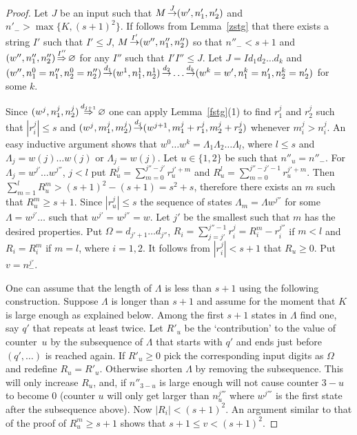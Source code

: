 \documentclass[12pt]{article}
\begin{document}
\begin{proof}
Let $J$ be an input such that $M\mathop{\to}\limits^{J}(w',n'_1,n'_2)$ and
$n'_->\max\{K,(s+1)^2\}$. If follows from Lemma~\ref{zstg} that there
exists a string $I'$ such that $I'\leq J$, $M\mathop{\to}\limits^{I'}(w'',n''_1,
n''_2)$ so that $n''_-<s+1$ and $(w'',n''_1,n''_2)\mathop{\Rightarrow}\limits^{I''}\varnothing$ 
for any $I''$ such that $I'I''\leq J$. Let $J=Id_1d_2\ldots d_k$ and 
$(w'',n^0_1=n''_1,n^0_2=n''_2)\dgn{1}(w^1,n^1_1,n^1_2)
\dgn{2}\discretionary{\ldots}{}{}\ldots\dgn{k}(w^k=w',n^k_1=n'_1,n^k_2=n'_2)$ for some
$k$. 

Since $(w^j,n^j_1, n^j_2)\mathop{\Rightarrow}\limits^{d_{j+1}}\varnothing$ one can apply Lemma~\ref{fstg}(1) to
find $r_1^j$ and $r_2^j$ such that $|r_i^j|\leq s$ and
$(w^j,m^j_1,m^j_2)\mathop{\to}\limits^{d_j}(w^{j+1}, m^j_1+r_1^j, m^j_2+r_2^j)$
whenever $m^j_i>n^j_i$. An easy inductive argument shows that
$w^0\ldots w^k=\Lambda_1\Lambda_2\ldots\Lambda_l$,
where $l\leq s$ and $\Lambda_j=w(j)\ldots w(j)$ or
$\Lambda_j=w(j)$. Let $u\in\{1,2\}$ be such that $n''_u=n''_-$. For
  $\Lambda_j=w^{j'}\ldots w^{j''}$, $j<l$ put 
$R^j_u=\sum_{m=0}^{j''-j'}r_u^{j'+m}$ and
$R^l_u=\sum_{m=0}^{j''-j'-1}r_u^{j'+m}$. Then
$\sum_{m=1}^lR^m_u>(s+1)^2-(s+1)=s^2+s$, therefore there exists an
$m$ such that $R^m_u\geq s+1$. Since $|r_u^j|\leq s$ the sequence of
states $\Lambda_m=\Lambda w^{j''}$ for some
$\Lambda=w^{j'}\ldots$ such that $w^{j'}=w^{j''}=w$. Let $j'$ be the
smallest such that $m$ has the desired properties. Put
$\Omega=d_{j'+1}\ldots d_{j''}$,
$R_i=\sum_{j=j'}^{j''-1}r_i^j=R^m_i-r_i^{j''}$ if $m<l$ and
$R_i=R^m_i$ if $m=l$, where $i=1,2$. It follows from $|r^j_i|<s+1$
that $R_u\geq0$. Put $v=n^{j'}_-$. 

One can assume that the length of $\Lambda$ is less than $s+1$ using
the following construction. Suppose $\Lambda$ is longer than $s+1$
and assume for the moment that $K$ is large enough as explained
below. Among the first $s+1$ states in $\Lambda$ find one, say $q'$ that
repeats at least twice. Let $R'_u$ be the `contribution' to the value
of counter~$u$ by the
subsequence of $\Lambda$ that starts with $q'$ and ends just before
$(q',\ldots)$ is reached again. If $R'_u\geq0$ pick the corresponding
input digits as $\Omega$ and redefine $R_u=R'_u$. Otherwise shorten
$\Lambda$ by removing the subsequence. This will only increase $R_u$,
and, if $n''_{3-u}$ is large enough will not cause counter $3-u$ to
become 0 (counter $u$ will only get larger than $n^{j'''}_u$ where $w^{j'''}$ is
the first state after the subsequence above). Now $|R_i|<(s+1)^2$.  
An argument similar to that of the proof of $R^m_u\geq
s+1$ shows that $s+1\leq v<(s+1)^2$.


\end{proof}
\end{document}
